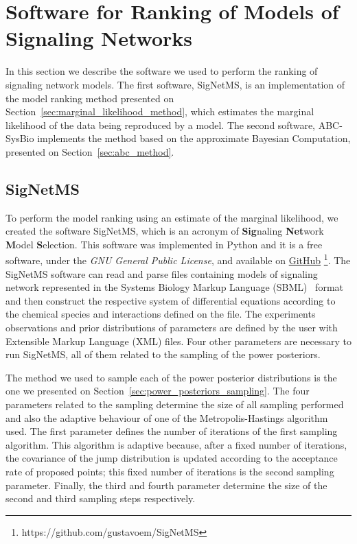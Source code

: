 \section{Software for Ranking of Models of Signaling Networks}
In this section we describe the software we used to perform the ranking
of signaling network models. The first software, SigNetMS, is an 
implementation of the model ranking method presented on 
Section~\ref{sec:marginal_likelihood_method}, which estimates the 
marginal likelihood of the data being reproduced by a model.  The second 
software, ABC-SysBio implements the method based on the approximate 
Bayesian Computation, presented on Section~\ref{sec:abc_method}.

\subsection{SigNetMS}
To perform the model ranking using an estimate of the marginal 
likelihood, we created the software SigNetMS, which is an acronym of 
{\bf Sig}naling {\bf Net}work {\bf M}odel {\bf S}election. This software
was implemented in Python and it is a free software, under the \emph{GNU 
General Public License}, and available on
\href{https://github.com/gustavoem/SigNetMS}{GitHub}
\footnote{https://github.com/gustavoem/SigNetMS}. The SigNetMS 
software can read and parse files containing models of signaling network 
represented in the Systems Biology Markup Language 
(SBML)~\cite{Hucka2003} format and then construct the respective system 
of differential equations according to the chemical species and 
interactions defined on the file. The experiments observations and prior 
distributions of parameters are defined by the user with Extensible 
Markup Language (XML) files. Four other parameters are necessary to run 
SigNetMS, all of them related to the sampling of the power posteriors. 

The method we used to sample each of the power posterior distributions
is the one we presented on Section~\ref{sec:power_posteriors_sampling}.
The four parameters related to the sampling determine the size of all
sampling  performed and also the adaptive behaviour of one of the 
Metropolis-Hastings algorithm used. The first parameter defines the 
number of iterations of the first sampling algorithm. This algorithm is 
adaptive because, after a fixed number of iterations, the covariance of 
the jump distribution is updated according to the acceptance rate of 
proposed points; this fixed number of iterations is the second sampling 
parameter. Finally, the third and fourth parameter determine the size of
the second and third sampling steps respectively.

